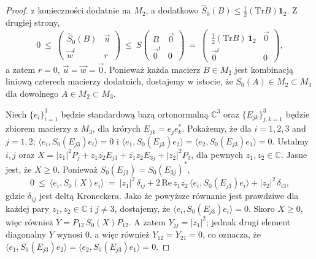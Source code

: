 \begin{proof}
z konieczności dodatnie na $M_{2}$, a dodatkowo
$\hat{S}_{0}(B) \leq \frac{1}{2} (\text{Tr} B) \mathbf{1}_{2}$.
Z drugiej strony,
\begin{equation}
 0 \: \leq \:
 \begin{pmatrix}
  \hat{S}_{0}(B) & \vec{u} \\ \vec{w}^{t} & r
 \end{pmatrix} \: \leq \:
            S \begin{pmatrix}
               B & \vec{0} \\ \vec{0}^{t} & 0
              \end{pmatrix} \: = \:
 \begin{pmatrix}
  \frac{1}{2} (\text{Tr} B) \, \mathbf{1}_{2} & \vec{0} \\ \vec{0}^{t} & 0
 \end{pmatrix},
\end{equation}
a zatem $r=0$, $\vec{u}=\vec{w}=\vec{0}$.
Ponieważ każda macierz $B \in M_{2}$ jest kombinacją liniową czterech macierzy
dodatnich, dostajemy w istocie, że
$S_{0}(A) \in M_{2} \! \subset \! M_{3}$
dla dowolnego $A \in M_{2} \! \subset \! M_{3}$.

Niech $\{e_{i}\}_{i=1}^{3}$ będzie standardową
bazą ortonormalną $\mathbb{C}^{3}$
oraz $\{ E_{jk} \}_{j,k=1}^{3}$ będzie zbiorem macierzy z $M_{3}$,
dla krórych $E_{jk} = e_{j} e_{k}^{*}$.
Pokażemy, że dla $i = 1,2,3$ and $j=1,2$;
$\langle e_{i}, S_{0}(E_{j3}) e_{i} \rangle = 0$
i $\langle e_{1}, S_{0}(E_{j3}) e_{2} \rangle =
    \langle e_{2}, S_{0}(E_{j3}) e_{1} \rangle = 0$.
Ustalmy $i,j$ oraz
$X = |z_{1}|^{2} P_{j} + z_{1} \overline{z_{2}} E_{j3} +
\overline{z_{1}} z_{2} E_{3j} + |z_{2}|^{2} P_{3}$,
dla pewnych $z_{1}, z_{2} \in \mathbb{C}$.
Jasne jest, że $X \geq 0$.
Ponieważ $S_{0}(E_{j3}) = S_{0}(E_{3j})^{*}$,
\begin{equation}
0 \: \leq \: \langle e_{i}, S_{0}(X) e_{i} \rangle \: = \:
|z_{1}|^{2} \, \delta_{ij} +
2 \, \text{Re} \, z_{1} \overline{z_{2}} \,
    \langle e_{i}, S_{0}(E_{j3}) e_{i} \rangle +
|z_{2}|^{2} \, \delta_{i3},
\end{equation}
gdzie $\delta_{ij}$ jest deltą Kroneckera.
Jako że powyższe równanie jest prawdziwe dla każdej pary
$z_{1}, z_{2} \in \mathbb{C}$ i $j \neq 3$,
dostajemy, że $\langle e_{i}, S_{0}(E_{j3}) e_{i} \rangle =0$.
Skoro $X \geq 0$, więc również $Y = P_{12} \, S_{0}(X) P_{12}$.
A zatem $Y_{jj} = |z_{1}|^{2}$;
jednak drugi element diagonalny $Y$ wynosi 0, a więc również
$Y_{12} = Y_{21} = 0$,
co oznacza, że
$\langle e_{1}, S_{0}(E_{j3}) e_{2} \rangle
    = \langle e_{2}, S_{0}(E_{j3}) e_{1} \rangle = 0$.


\end{proof}
